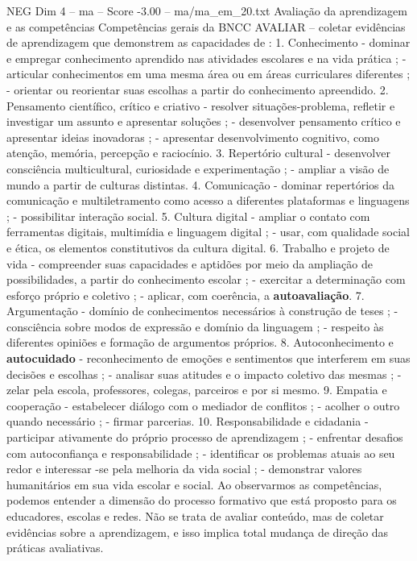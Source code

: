 \begin{textsample}{NEG Dim 4 – ma – Score -3.00 – ma/ma\_em\_20.txt}
Avaliação da aprendizagem e as competências Competências gerais da BNCC AVALIAR – coletar evidências de aprendizagem que demonstrem as capacidades de : 1.
Conhecimento - dominar e empregar conhecimento aprendido nas atividades escolares e na vida prática ; - articular conhecimentos em uma mesma área ou em áreas curriculares diferentes ; - orientar ou reorientar suas escolhas a partir do conhecimento apreendido. 2.
Pensamento científico, crítico e criativo - resolver situações-problema, refletir e investigar um assunto e apresentar soluções ; - desenvolver pensamento crítico e apresentar ideias inovadoras ; - apresentar desenvolvimento cognitivo, como atenção, memória, percepção e raciocínio. 3.
Repertório cultural - desenvolver consciência multicultural, curiosidade e experimentação ; - ampliar a visão de mundo a partir de culturas distintas. 4.
Comunicação - dominar repertórios da comunicação e multiletramento como acesso a diferentes plataformas e linguagens ; - possibilitar interação social. 5.
Cultura digital - ampliar o contato com ferramentas digitais, multimídia e linguagem digital ; - usar, com qualidade social e ética, os elementos constitutivos da cultura digital. 6.
Trabalho e projeto de vida - compreender suas capacidades e aptidões por meio da ampliação de possibilidades, a partir do conhecimento escolar ; - exercitar a determinação com esforço próprio e coletivo ; - aplicar, com coerência, a \textbf{autoavaliação}. 7.
Argumentação - domínio de conhecimentos necessários à construção de teses ; - consciência sobre modos de expressão e domínio da linguagem ; - respeito às diferentes opiniões e formação de argumentos próprios. 8.
Autoconhecimento e \textbf{autocuidado} - reconhecimento de emoções e sentimentos que interferem em suas decisões e escolhas ; - analisar suas atitudes e o impacto coletivo das mesmas ; - zelar pela escola, professores, colegas, parceiros e por si mesmo. 9.
Empatia e cooperação - estabelecer diálogo com o mediador de conflitos ; - acolher o outro quando necessário ; - firmar parcerias. 10.
Responsabilidade e cidadania - participar ativamente do próprio processo de aprendizagem ; - enfrentar desafios com autoconfiança e responsabilidade ; - identificar os problemas atuais ao seu redor e interessar -se pela melhoria da vida social ; - demonstrar valores humanitários em sua vida escolar e social.
Ao observarmos as competências, podemos entender a dimensão do processo formativo que está proposto para os educadores, escolas e redes.
Não se trata de avaliar conteúdo, mas de coletar evidências sobre a aprendizagem, e isso implica total mudança de direção das práticas avaliativas.

\end{textsample}
